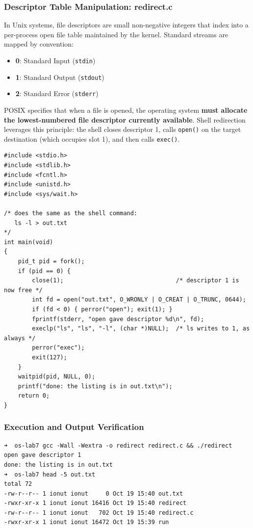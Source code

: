 \documentclass{labreport}
\begin{document}
\subsubsection{Descriptor Table Manipulation: redirect.c}
In Unix systems, file descriptors are small non-negative integers that index into a per-process open file table maintained by the kernel. Standard streams are mapped by convention:
\begin{itemize}[noitemsep]
    \item \textbf{0}: Standard Input (\texttt{stdin})
    \item \textbf{1}: Standard Output (\texttt{stdout})
    \item \textbf{2}: Standard Error (\texttt{stderr})
\end{itemize}
POSIX specifies that when a file is opened, the operating system \textbf{must allocate the lowest-numbered file descriptor currently available}. Shell redirection leverages this principle: the shell closes descriptor 1, calls \texttt{open()} on the target destination (which occupies slot 1), and then calls \texttt{exec()}.

\begin{lstlisting}[style=c]
#include <stdio.h>
#include <stdlib.h>
#include <fcntl.h>
#include <unistd.h>
#include <sys/wait.h>

/* does the same as the shell command:
   ls -l > out.txt
*/
int main(void)
{
    pid_t pid = fork();
    if (pid == 0) {
        close(1);                                /* descriptor 1 is now free */
        int fd = open("out.txt", O_WRONLY | O_CREAT | O_TRUNC, 0644);
        if (fd < 0) { perror("open"); exit(1); }
        fprintf(stderr, "open gave descriptor %d\n", fd);
        execlp("ls", "ls", "-l", (char *)NULL);  /* ls writes to 1, as always */
        perror("exec");
        exit(127);
    }
    waitpid(pid, NULL, 0);
    printf("done: the listing is in out.txt\n");
    return 0;
}
\end{lstlisting}

\subsubsection{Execution and Output Verification}
\begin{lstlisting}[style=bash]
➜  os-lab7 gcc -Wall -Wextra -o redirect redirect.c && ./redirect
open gave descriptor 1
done: the listing is in out.txt
➜  os-lab7 head -5 out.txt
total 72
-rw-r--r-- 1 ionut ionut     0 Oct 19 15:40 out.txt
-rwxr-xr-x 1 ionut ionut 16416 Oct 19 15:40 redirect
-rw-r--r-- 1 ionut ionut   702 Oct 19 15:40 redirect.c
-rwxr-xr-x 1 ionut ionut 16472 Oct 19 15:39 run
\end{lstlisting}
\end{document}
